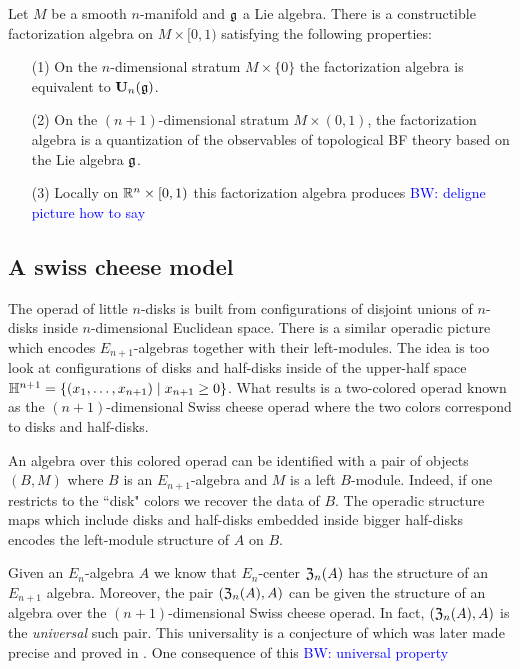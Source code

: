 \documentclass[11pt]{amsart}
\numberwithin{equation}{section}
\def\brian{\textcolor{blue}{BW: }\textcolor{blue}}
\begin{document}
\begin{thm}
Let $M$ be a smooth $n$-manifold and $\mathfrak g$ a Lie algebra. 
There is a constructible factorization algebra on $M \times [0,1)$ satisfying the following properties:
\begin{itemize}
\item[(1)] On the $n$-dimensional stratum $M \times \{0\}$ the factorization algebra is equivalent to $\mathbf U_n(\mathfrak g)$.
\item[(2)] On the $(n+1)$-dimensional stratum $M \times (0,1)$, the factorization algebra is a quantization of the observables of topological BF theory based on the Lie algebra $\mathfrak g$.
\item[(3)] Locally on $\mathbb R^n \times [0,1)$ this factorization algebra produces \brian{deligne picture how to say}
\end{itemize}
\end{thm}


\subsection{A swiss cheese model}

The operad of little $n$-disks is built from configurations of disjoint unions of $n$-disks inside $n$-dimensional Euclidean space.
There is a similar operadic picture which encodes $E_{n+1}$-algebras together with their left-modules. 
The idea is too look at configurations of disks and half-disks inside of the upper-half space $\mathbb H^{n+1} = \{(x_1,\ldots, x_{n+1}) \; | \; x_{n+1} \geq 0\}$. 
What results is a two-colored operad known as the $(n+1)$-dimensional Swiss cheese operad where the two colors correspond to disks and half-disks. 

An algebra over this colored operad can be identified with a pair of objects $(B,M)$ where $B$ is an $E_{n+1}$-algebra and $M$ is a left $B$-module. 
Indeed, if one restricts to the ``disk" colors we recover the data of $B$. 
The operadic structure maps which include disks and half-disks embedded inside bigger half-disks encodes the left-module structure of $A$ on $B$.

Given an $E_n$-algebra $A$ we know that $E_n$-center $\mathfrak Z_n(A)$ has the structure of an $E_{n+1}$ algebra.
Moreover, the pair $(\mathfrak Z_{n} (A), A)$ can be given the structure of an algebra over the $(n+1)$-dimensional Swiss cheese operad. 
In fact, $(\mathfrak Z_{n} (A), A)$ is the {\em universal} such pair.
This universality is a conjecture of \cite{Kontsevich} which was later made precise and proved in \cite{Thomas, Tamarkin, Dolgushev, jnkf others?}. 
One consequence of this \brian{universal property}
\end{document}
